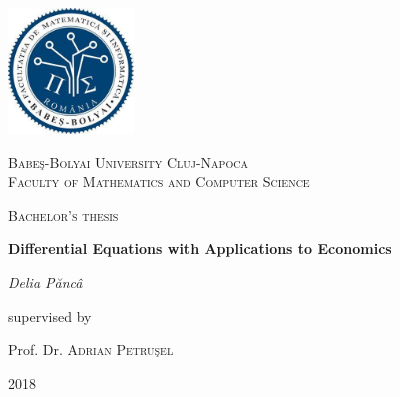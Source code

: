 \documentclass[a4paper,11pt]{report}
\newcommand\blankpage{%
    \null
    \thispagestyle{empty}%
    \addtocounter{page}{-1}%
    \newpage}
\begin{document}
 \begin{titlepage}
	\centering
	\includegraphics[width=0.25\textwidth]{Facultate1.jpg}\par\vspace{1cm}
	{\scshape\LARGE Babe\c{s}-Bolyai University Cluj-Napoca\\ Faculty of Mathematics and Computer Science \par}
	\vspace{1cm}
	{\scshape\Large Bachelor's thesis\par}
	\vspace{1.5cm}
	{\huge\bfseries Differential Equations with Applications to Economics\par}
	\vspace{2cm}
	{\Large\itshape Delia P\u{a}nc\^{a}\par}
	\vfill
	supervised by\par
	Prof. Dr.  \textsc{Adrian Petru\c{s}el}

	\vfill

	{2018}
\end{titlepage}
 \tableofcontents
 \blankpage
\end{document}
